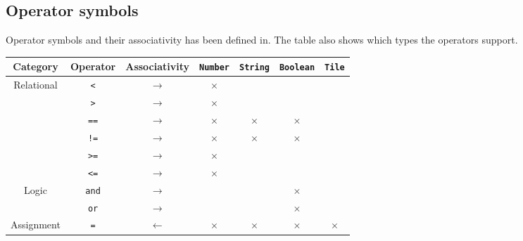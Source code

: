 \subsection{Operator symbols}
Operator symbols and their associativity has been defined in. The table also shows which types the operators support.

\begin{table}[h!]
    \centering
    \begin{tabular}{ |c|c|c||c|c|c|c| }
        \hline
        \textbf{Category} & \textbf{Operator} & \textbf{Associativity} & \texttt{Number} & \texttt{String} & \texttt{Boolean} & \texttt{Tile} \\                              
        \hline

        \multirow{6}{*}{Relational} 
        & \texttt{<}
        & $\rightarrow$ 
        & $\times$
        & 
        & 
        & 
        \\
        
         
        & \texttt{>} 
        & $\rightarrow$ 
        & $\times$
        & 
        & 
        & 
        \\

        
        & \texttt{==} 
        & $\rightarrow$ 
        & $\times$
        & $\times$
        & $\times$
        & 
        \\

         
        & \texttt{!=} 
        & $\rightarrow$ 
        & $\times$
        & $\times$
        & $\times$
        & 
        \\

         
        & \texttt{>=} 
        & $\rightarrow$ 
        & $\times$
        & 
        &  
        &  
        \\

         
        & \texttt{<=} 
        & $\rightarrow$ 
        & $\times$
        &  
        &  
        &  
        \\\hline

        \multirow{2}{*}{Logic}
        & \texttt{and} 
        & $\rightarrow$ 
        & 
        &  
        & $\times$ 
        & 
        \\
 
        & \texttt{or} 
        & $\rightarrow$ 
        & 
        &  
        & $\times$ 
        &  
        \\\hline
        
        Assignment 
        & \texttt{=}
        & $\leftarrow$ 
        & $\times$ 
        & $\times$
        & $\times$
        & $\times$
        \\\hline
        

\end{tabular}
\end{table}
